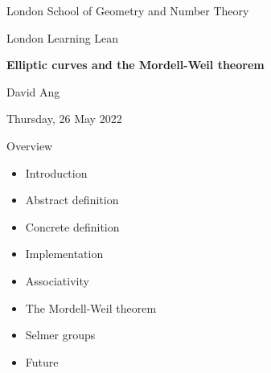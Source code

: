 \documentclass[10pt]{beamer}
\begin{document}
\begin{frame}

\begin{center}

{\scriptsize London School of Geometry and Number Theory}

\vspace{0.5cm}

{\small London Learning Lean}

\vspace{1cm}

\textbf{\large Elliptic curves and the Mordell-Weil theorem}

\vspace{1cm}

David Ang

\vspace{0.5cm}

{\footnotesize Thursday, 26 May 2022}

\end{center}

\end{frame}

\begin{frame}{Overview}

\begin{itemize}
\item Introduction
\item Abstract definition
\item Concrete definition
\item Implementation
\item Associativity
\item The Mordell-Weil theorem
\item Selmer groups
\item Future
\end{itemize}

\end{frame}
\end{document}
